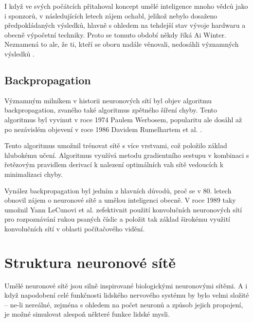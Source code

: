 I když ve svých počátcích přitahoval koncept umělé inteligence mnoho vědců jako
i sponzorů, v následujících letech zájem ochabl, jelikož nebylo dosaženo
předpokládaných výsledků, hlavně s ohledem na tehdejší stav vývoje hardwaru a
obecně výpočetní techniky. Proto se tomuto období někdy říká Ai Winter.
Neznamená to ale, že ti, kteří se oboru nadále věnovali, nedosáhli významných
výsledků \cite{nn_history}.

\subsection{Backpropagation}
Významným milníkem v historii neuronových sítí byl objev algoritmu
backpropagation, zvaného také algoritmus zpětného šíření chyby. Tento
algoritmus byl vyvinut v roce 1974 Paulem Werbosem, popularitu ale dosáhl až po
nezávislém objevení v roce 1986 Davidem Rumelhartem et al.
\cite{backpropagation}.

Tento algoritmus umožnil trénovat sítě s více vrstvami, což položilo základ
hlubokému učení. Algoritmus využívá metodu gradientního sestupu v kombinaci s
řetězovým pravidlem derivací k nalezení optimálních vah sítě vedoucích k
minimalizaci chyby.

Vynález backpropagation byl jedním z hlavních důvodů, proč se v 80. letech
obnovil zájem o neuronové sítě a umělou inteligenci obecně. V roce 1989 taky
umožnil Yann LeCunovi et al. zefektivnit použití konvolučních neuronových sítí
pro rozpoznávání rukou psaných číslic \cite{lecun1989} a položit tak základ
širokému využití konvolučních sítí v oblasti počítačového vidění.

\section{Struktura neuronové sítě}

Umělé neuronové sítě jsou silně inspirované biologickými neuronovými sítěmi. A
i když napodobení celé funkčnosti lidského nervového systému by bylo velmi
složité – ne-li nereálné, zejména s ohledem na počet neuronů a způsob jejich
propojení, je možné simulovat alespoň některé funkce lidské mysli.


